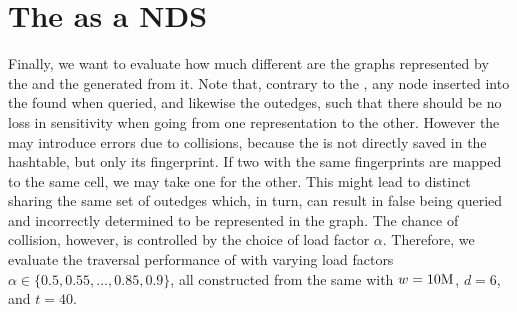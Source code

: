\section{The \dBHT as a NDS}
\label{sec:results-dbht}

Finally, we want to evaluate how much different are the graphs represented by the \dBCM and the \dBHT generated from it. Note that, contrary to the \dBCM, any node inserted into the \dBHT found when queried, and likewise the outedges, such that there should be no loss in sensitivity when going from one representation to the other. However the \dBHT may introduce errors due to collisions, because the \kmer is not directly saved in the hashtable, but only its fingerprint. If two  with the same fingerprints are mapped to the same cell, we may take one for the other. This might lead to distinct  sharing the same set of outedges which, in turn, can result in false  being queried and incorrectly determined to be represented in the graph. The chance of collision, however, is controlled by the choice of load factor $\alpha$. Therefore, we evaluate the traversal performance of  with varying load factors $\alpha \in \{0.5, 0.55, \ldots, 0.85, 0.9\}$, all constructed from the same \dBCM with $w = 10\mega$, $d = 6$, and $t = 40$.

